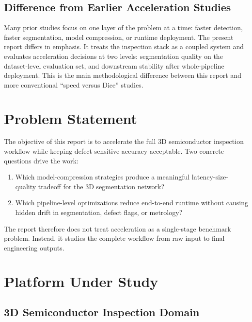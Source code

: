 \hypertarget{difference-from-earlier-acceleration-studies}{%
\subsection{Difference from Earlier Acceleration
Studies}\label{difference-from-earlier-acceleration-studies}}

Many prior studies focus on one layer of the problem at a time: faster
detection, faster segmentation, model compression, or runtime
deployment. The present report differs in emphasis. It treats the
inspection stack as a coupled system and evaluates acceleration
decisions at two levels: segmentation quality on the dataset-level
evaluation set, and downstream stability after whole-pipeline
deployment. This is the main methodological difference between this
report and more conventional ``speed versus Dice'' studies.

\hypertarget{problem-statement}{%
\section{Problem Statement}\label{problem-statement}}

The objective of this report is to accelerate the full 3D semiconductor
inspection workflow while keeping defect-sensitive accuracy acceptable.
Two concrete questions drive the work:

\begin{enumerate}
\def\labelenumi{\arabic{enumi}.}
\tightlist
\item
  Which model-compression strategies produce a meaningful
  latency-size-quality tradeoff for the 3D segmentation network?
\item
  Which pipeline-level optimizations reduce end-to-end runtime without
  causing hidden drift in segmentation, defect flags, or metrology?
\end{enumerate}

The report therefore does not treat acceleration as a single-stage
benchmark problem. Instead, it studies the complete workflow from raw
input to final engineering outputs.

\hypertarget{platform-under-study}{%
\section{Platform Under Study}\label{platform-under-study}}

\subsection{3D Semiconductor Inspection Domain}


